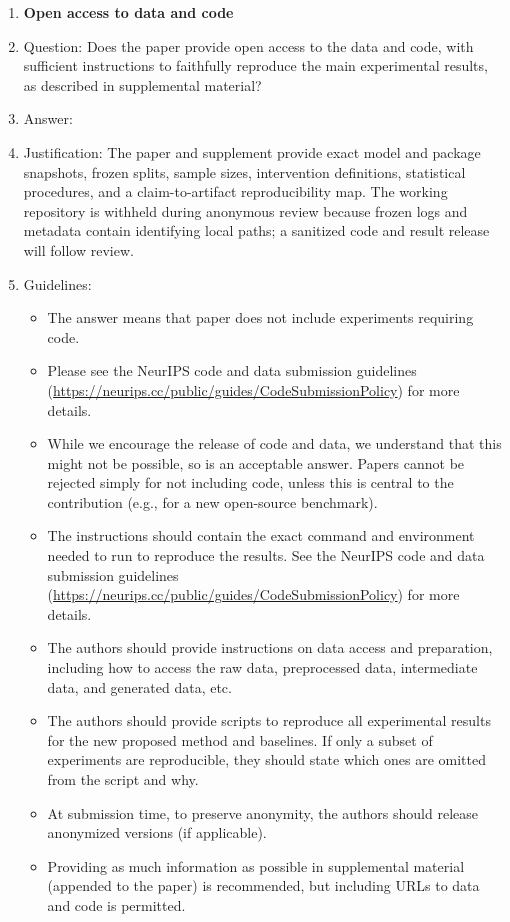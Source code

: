 \documentclass[
]{article}
\begin{document}
\begin{enumerate}
\item {\bf Open access to data and code}
    \item[] Question: Does the paper provide open access to the data and code, with sufficient instructions to faithfully reproduce the main experimental results, as described in supplemental material?
    \item[] Answer: \answerNo{} %
    \item[] Justification: The paper and supplement provide exact model and package snapshots, frozen splits, sample sizes, intervention definitions, statistical procedures, and a claim-to-artifact reproducibility map. The working repository is withheld during anonymous review because frozen logs and metadata contain identifying local paths; a sanitized code and result release will follow review.
    \item[] Guidelines:
    \begin{itemize}
        \item The answer \answerNA{} means that paper does not include experiments requiring code.
        \item Please see the NeurIPS code and data submission guidelines (\url{https://neurips.cc/public/guides/CodeSubmissionPolicy}) for more details.
        \item While we encourage the release of code and data, we understand that this might not be possible, so \answerNo{} is an acceptable answer. Papers cannot be rejected simply for not including code, unless this is central to the contribution (e.g., for a new open-source benchmark).
        \item The instructions should contain the exact command and environment needed to run to reproduce the results. See the NeurIPS code and data submission guidelines (\url{https://neurips.cc/public/guides/CodeSubmissionPolicy}) for more details.
        \item The authors should provide instructions on data access and preparation, including how to access the raw data, preprocessed data, intermediate data, and generated data, etc.
        \item The authors should provide scripts to reproduce all experimental results for the new proposed method and baselines. If only a subset of experiments are reproducible, they should state which ones are omitted from the script and why.
        \item At submission time, to preserve anonymity, the authors should release anonymized versions (if applicable).
        \item Providing as much information as possible in supplemental material (appended to the paper) is recommended, but including URLs to data and code is permitted.
    \end{itemize}



\end{enumerate}
\end{document}
